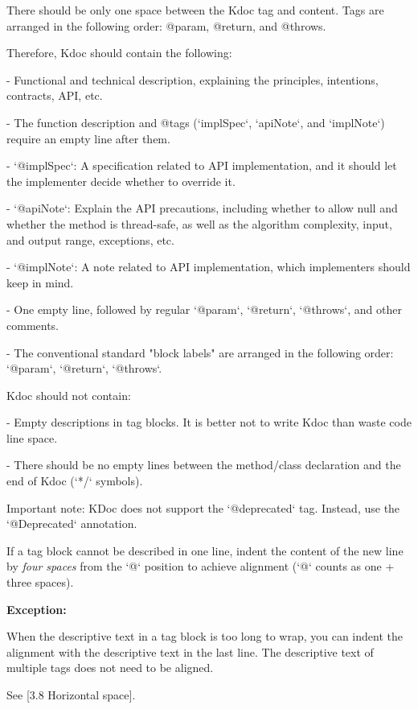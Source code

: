 There should be only one space between the Kdoc tag and content. Tags are arranged in the following order: @param, @return, and @throws.



Therefore, Kdoc should contain the following:

- Functional and technical description, explaining the principles, intentions, contracts, API, etc.

- The function description and @tags (`implSpec`, `apiNote`, and `implNote`) require an empty line after them.

- `@implSpec`: A specification related to API implementation, and it should let the implementer decide whether to override it.

- `@apiNote`: Explain the API precautions, including whether to allow null and whether the method is thread-safe, as well as the algorithm complexity, input, and output range, exceptions, etc.

- `@implNote`: A note related to API implementation, which implementers should keep in mind.

- One empty line, followed by regular `@param`, `@return`, `@throws`, and other comments.

- The conventional standard "block labels" are arranged in the following order: `@param`, `@return`, `@throws`.

Kdoc should not contain:

- Empty descriptions in tag blocks. It is better not to write Kdoc than waste code line space.

- There should be no empty lines between the method/class declaration and the end of Kdoc (`*/` symbols).

Important note: KDoc does not support the `@deprecated` tag. Instead, use the `@Deprecated` annotation.

 

If a tag block cannot be described in one line, indent the content of the new line by \textit{four spaces} from the `@` position to achieve alignment (`@` counts as one + three spaces).

 

\textbf{Exception:}

 

When the descriptive text in a tag block is too long to wrap, you can indent the alignment with the descriptive text in the last line. The descriptive text of multiple tags does not need to be aligned.

See [3.8 Horizontal space].



